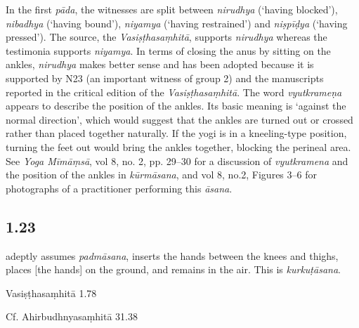 \begin{ekdosis}
\begin{philcomm}[hp01_022]   
In the first \emph{pāda}, the witnesses are split between \emph{nirudhya} (‘having blocked’), \emph{nibadhya} (‘having bound’), \emph{niyamya} (‘having restrained’) and \emph{niṣpīḍya} (‘having pressed’). The source, the \emph{Vasiṣṭhasaṃhitā}, supports \emph{nirudhya} whereas the testimonia supports \emph{niyamya}. In terms of closing the anus by sitting on the ankles, \emph{nirudhya} makes better sense and has been adopted because it is supported by N23 (an important witness of group 2) and the manuscripts reported in the critical edition of the \emph{Vasiṣṭhasaṃhitā}. The word \emph{vyutkrameṇa} appears to describe the position of the ankles. Its basic meaning is ‘against the normal direction’, which would suggest that the ankles are turned out or crossed rather than placed together naturally. If the yogi is in a kneeling-type position, turning the feet out would bring the ankles together, blocking the perineal area. See \emph{Yoga Mīmāṃsā}, vol 8, no. 2, pp. 29–30 for a discussion of \emph{vyutkramena} and the position of the ankles in \emph{kūrmāsana}, and vol 8, no.2, Figures 3–6 for photographs of a practitioner performing this \emph{āsana}. 
\end{philcomm}

\subsection*{1.23}
\begin{translation} adeptly assumes \emph{padmāsana}, inserts the hands between the knees and thighs, places [the hands] on the ground, and remains in the air. This is \emph{kurkuṭāsana}.
\end{translation}

\begin{sources}[hp01_023]
Vasiṣṭhasaṃhitā 1.78

\begin{versinnote}
\end{versinnote}

Cf. Ahirbudhnyasaṃhitā 31.38

\begin{versinnote}
\end{versinnote}


\end{sources}
\end{ekdosis}
